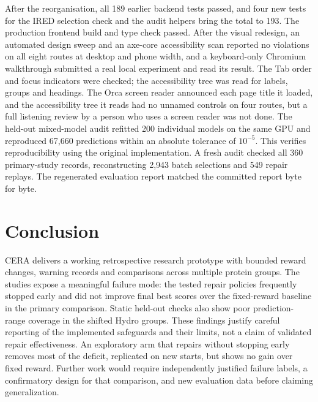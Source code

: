 \documentclass[11pt,a4paper]{article}
\begin{document}
After the reorganisation, all 189 earlier backend tests passed, and four new tests for the IRED selection check and the audit helpers bring the total to 193. The production frontend build and type check passed. After the visual redesign, an automated design sweep and an axe-core accessibility scan reported no violations on all eight routes at desktop and phone width, and a keyboard-only Chromium walkthrough submitted a real local experiment and read its result. The Tab order and focus indicators were checked; the accessibility tree was read for labels, groups and headings. The Orca screen reader announced each page title it loaded, and the accessibility tree it reads had no unnamed controls on four routes, but a full listening review by a person who uses a screen reader was not done. The held-out mixed-model audit refitted 200 individual models on the same GPU and reproduced 67,660 predictions within an absolute tolerance of $10^{-5}$. This verifies reproducibility using the original implementation. A fresh audit checked all 360 primary-study records, reconstructing 2,943 batch selections and 549 repair replays. The regenerated evaluation report matched the committed report byte for byte.

\section{Conclusion}
CERA delivers a working retrospective research prototype with bounded reward changes, warning records and comparisons across multiple protein groups. The studies expose a meaningful failure mode: the tested repair policies frequently stopped early and did not improve final best scores over the fixed-reward baseline in the primary comparison. Static held-out checks also show poor prediction-range coverage in the shifted Hydro groups. These findings justify careful reporting of the implemented safeguards and their limits, not a claim of validated repair effectiveness. An exploratory arm that repairs without stopping early removes most of the deficit, replicated on new starts, but shows no gain over fixed reward. Further work would require independently justified failure labels, a confirmatory design for that comparison, and new evaluation data before claiming generalization.
\end{document}

